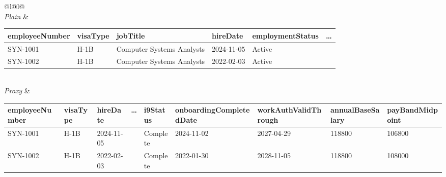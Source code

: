 {\scriptsize\ttfamily\setlength{\tabcolsep}{3pt}\renewcommand{\arraystretch}{1.15}%
\begin{tabular}{@{}l@{\hspace{10pt}}l@{}}
\\[2pt]
\textnormal{\footnotesize\textit{Plain}} &
\begin{tabular}{llllll}
\toprule
employeeNumber & visaType & jobTitle & hireDate & employmentStatus & \ldots\\
\midrule
SYN-1001 & H-1B & Computer Systems Analysts & 2024-11-05 & Active & \\
SYN-1002 & H-1B & Computer Systems Analysts & 2022-02-03 & Active & \\
\bottomrule
\end{tabular}\\[16pt]
\textnormal{\footnotesize\textit{Proxy}} &
\begin{tabular}{llll>{\columncolor{fgorange!14}}l>{\columncolor{fgorange!14}}l>{\columncolor{fgorange!14}}l>{\columncolor{fgorange!14}}l>{\columncolor{fgorange!14}}l}
\toprule
employeeNumber & visaType & hireDate & \ldots & i9Status & onboardingCompletedDate & workAuthValidThrough & annualBaseSalary & payBandMidpoint\\
\midrule
SYN-1001 & H-1B & 2024-11-05 & & Complete & 2024-11-02 & 2027-04-29 & 118800 & 106800\\
SYN-1002 & H-1B & 2022-02-03 & & Complete & 2022-01-30 & 2028-11-05 & 118800 & 108000\\
\bottomrule
\end{tabular}
\end{tabular}}
